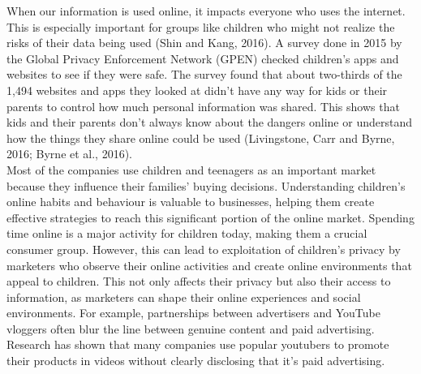 \documentclass[a4paper, 10 pt, conference]{ieeeconf}  %
\begin{document}
When our information is used online, it impacts everyone who uses the internet. This is especially important for groups like children who might not realize the risks of their data being used (Shin and Kang, 2016). A survey done in 2015 by the Global Privacy Enforcement Network (GPEN) checked children's apps and websites to see if they were safe. The survey found that about two-thirds of the 1,494 websites and apps they looked at didn't have any way for kids or their parents to control how much personal information was shared. This shows that kids and their parents don’t always know about the dangers online or understand how the things they share online could be used (Livingstone, Carr and Byrne, 2016; Byrne et al., 2016). 
\\ Most of the companies use children and teenagers as an important market because they influence their families’ buying decisions. Understanding children's online habits and behaviour is valuable to businesses, helping them create effective strategies to reach this significant portion of the online market. Spending time online is a major activity for children today, making them a crucial consumer group. However, this can lead to exploitation of children’s privacy by marketers who observe their online activities and create online environments that appeal to children. This not only affects their privacy but also their access to information, as marketers can shape their online experiences and social environments. For example, partnerships between advertisers and YouTube vloggers often blur the line between genuine content and paid advertising. Research has shown that many companies use popular youtubers to promote their products in videos without clearly disclosing that it’s paid advertising.
\end{document}
